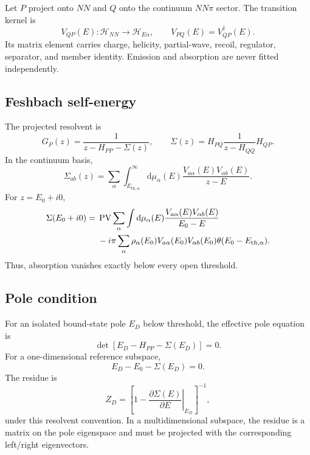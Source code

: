 \documentclass[11pt]{article}
\newcommand{\dd}{\mathrm{d}}
\newcommand{\PV}{\operatorname{PV}}
\newcommand{\Hil}{\mathcal H}
\newcommand{\HNN}{\Hil_{NN}}
\begin{document}
Let \(P\) project onto \(NN\) and \(Q\) onto the continuum \(NN\pi\) sector.
The transition kernel is
\begin{equation}
 V_{QP}(E):\HNN\longrightarrow\Hil_{E\alpha},
 \qquad
 V_{PQ}(E)=V_{QP}^{\dagger}(E).
 \label{eq:transition-kernel}
\end{equation}
Its matrix element carries charge, helicity, partial-wave, recoil, regulator,
separator, and member identity.  Emission and absorption are never fitted
independently.

\subsection{Feshbach self-energy}

The projected resolvent is
\begin{equation}
 G_P(z)
 =
 \frac{1}{z-H_{PP}-\Sigma(z)},
 \qquad
 \Sigma(z)=H_{PQ}\frac{1}{z-H_{QQ}}H_{QP}.
 \label{eq:projected-resolvent}
\end{equation}
In the continuum basis,
\begin{equation}
 \Sigma_{ab}(z)
 =
 \sum_\alpha
 \int_{E_{\mathrm{th},\alpha}}^\infty
 \dd\mu_\alpha(E)
 \frac{V_{a\alpha}(E)V_{\alpha b}(E)}{z-E}.
 \label{eq:self-energy-integral}
\end{equation}
For \(z=E_0+i0\),
\begin{align}
 \Sigma(E_0+i0)
 ={}&
 \PV\sum_\alpha\int\dd\mu_\alpha(E)
 \frac{V_{a\alpha}(E)V_{\alpha b}(E)}{E_0-E}
 \notag\\
 &-i\pi
 \sum_\alpha
 \rho_\alpha(E_0)V_{a\alpha}(E_0)V_{\alpha b}(E_0)
 \theta(E_0-E_{\mathrm{th},\alpha}).
 \label{eq:self-energy-disc}
\end{align}
Thus, absorption vanishes exactly below every open threshold.

\subsection{Pole condition}

For an isolated bound-state pole \(E_D\) below threshold, the effective
pole equation is
\begin{equation}
 \det\!
 \left[
 E_D-H_{PP}-\Sigma(E_D)
 \right]=0.
 \label{eq:pole-condition}
\end{equation}
For a one-dimensional reference subspace,
\begin{equation}
 E_D-E_{0}-\Sigma(E_D)=0.
 \label{eq:scalar-pole}
\end{equation}
The residue is
\begin{equation}
 Z_D
 =
 \left[
 1-\left.\frac{\partial\Sigma(E)}{\partial E}\right|_{E_D}
 \right]^{-1},
 \label{eq:pole-residue}
\end{equation}
under this resolvent convention.  In a multidimensional subspace, the residue
is a matrix on the pole eigenspace and must be projected with the corresponding
left/right eigenvectors.
\end{document}
